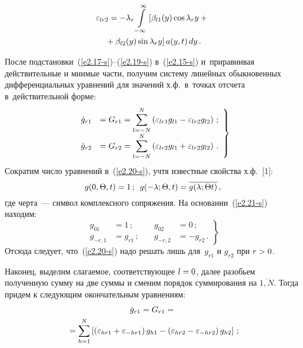 \begin{multicols}{2}
\vspace*{-12pt}

\noindent
\begin{multline}
\varepsilon_{lr2} =-\lambda_r\int\limits_{-\infty}^\infty \left[ \beta_{l1} (y) \cos \lambda_r y + {}\right.\\
\left.{}+\beta_{l2} (y)
 \sin \lambda_r y\right] a (y, t)\, dy\,.
 \label{e2.19-s}
 \end{multline}

После подстановки~(\ref{e2.17-s})--(\ref{e2.19-s}) в~(\ref{e2.15-s}) 
и~приравнивая действительные и мнимые части, получим систему линейных 
обыкновенных дифференциальных уравнений для значений х.ф.\ 
в~точках отсчета в~действительной форме:
\begin{equation}
\left.
\begin{array}{rl}
\dot g_{r1} &= G_{r1} = \displaystyle\sum\limits_{l=-N}^N \left( \varepsilon_{lr1} g_{l1} - 
    \varepsilon_{lr2} g_{l2}\right)\,;\\[6pt]
    \dot g_{r2} &= G_{r2} = \displaystyle\sum\limits_{l=-N}^N \left( \varepsilon_{lr2} g_{l1} + 
    \varepsilon_{lr2} g_{l2}\right)\,.
    \end{array}
    \right\}
    \label{e2.20-s}
    \end{equation}
Сократим число уравнений в~(\ref{e2.20-s}), учтя известные свойства х.ф.~[1]:
\begin{equation}
    g(0, \Theta, t) = 1\,; \enskip g(-\lambda; \Theta,t)= 
    \overline{g(\lambda;\Theta t)}\,,\label{e2.21-s}
    \end{equation}
где черта~--- символ комплексного сопряжения. На основании~(\ref{e2.21-s}) находим:
\begin{equation}
\left.
\begin{array}{rlrl}
g_{01} &=1\,;&\quad g_{02} &=0\,;\\[6pt]
 g_{-r,1} &= g_{r1}\,;&\quad 
    g_{-r,2} &= -g_{r2}\,.
    \end{array}
    \right\}
    \label{e2.22-s}
    \end{equation}
Отсюда следует, что~(\ref{e2.20-s}) надо решать лишь для~$g_{r1}$ и $g_{r2}$ при $r\hm>0$.

Наконец, выделим слагаемое, соответствующее $l\hm=0$, далее разобьем полученную 
сумму на две суммы и сменим порядок суммирования на $\overline{1,N}$. 
Тогда придем к следующим окончательным уравнениям:
    \begin{multline*}
    \dot g_{r1} = G_{r1} ={}\\
    {}= \sum\limits_{h=1}^N \left[ 
    \left( \varepsilon_{hr1} + \varepsilon_{-hr1}\right) g_{h1} -
    \left(\varepsilon_{hr2} -\varepsilon_{-hr2}\right) g_{h2} \right]\,;
\end{multline*}


\end{multicols}
